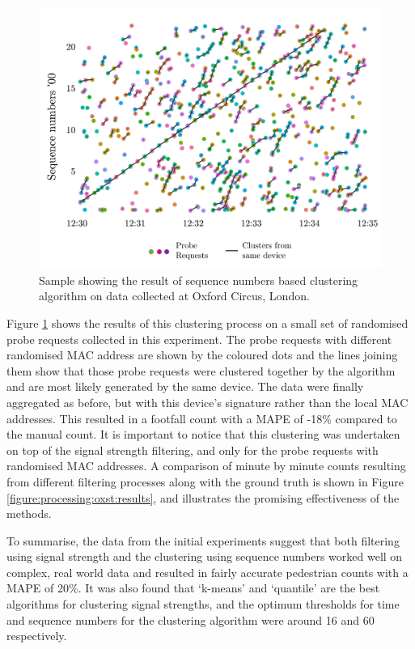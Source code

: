 \begin{figure}
  \includegraphics[trim={3 3 3 3},clip]{images/processing-oxst-fingerprinting.jpg}
  \caption{Sample showing the result of sequence numbers based clustering algorithm on data collected at Oxford Circus, London.}
  \label{figure:processing:oxst:fingerprinting}
\end{figure}

Figure \ref{figure:processing:oxst:fingerprinting} shows the results of this clustering process on a small set of randomised probe requests collected in this experiment.
The probe requests with different randomised MAC address are shown by the coloured dots and the lines joining them show that those probe requests were clustered together by the algorithm and are most likely generated by the same device.
The data were finally aggregated as before, but with this device’s signature rather than the local MAC addresses.
This resulted in a footfall count with a MAPE of -18\% compared to the manual count.
It is important to notice that this clustering was undertaken on top of the signal strength filtering, and only for the probe requests with randomised MAC addresses.
A comparison of minute by minute counts resulting from different filtering processes along with the ground truth is shown in Figure \ref{figure:processing:oxst:results}, and illustrates the promising effectiveness of the methods.

To summarise, the data from the initial experiments suggest that both filtering using signal strength and the clustering using sequence numbers worked well on complex, real world data and resulted in fairly accurate pedestrian counts with a MAPE of 20\%.
It was also found that ‘k-means’ and ‘quantile’ are the best algorithms for clustering signal strengths, and the optimum thresholds for time and sequence numbers for the clustering algorithm were around 16 and 60 respectively.

